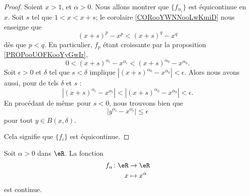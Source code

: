 \begin{proof}
	Soient \( x>1\), et \( \alpha>0\). Nous allons montrer que \( \{ f_{\alpha_i} \}\) est équicontinue en \( x\). Soit \( s\) tel que \( 1<x<x+s\); le corolaire \ref{CORooYWNNooLwKmiD} nous enseigne que
	\begin{equation}
		(x+s)^p-x^p<(x+s)^q-x^q
	\end{equation}
	dès que \( p<q\). En particulier, \( f_p\) étant croissante par la proposition \ref{PROPooUOFKooYyGwIr},
	\begin{equation}
		0<(x+s)^{\alpha_i}-x^{\alpha_i}<(x+s)^{\alpha_0}-x^{\alpha_0}.
	\end{equation}
	Soit \( \epsilon>0\) et \( \delta\) tel que \( s<\delta\) implique \( | (x+s)^{\alpha_0}-x^{\alpha_0} |<\epsilon\). Alors nous avons aussi, pour de tels \( \delta\) et \( s\) :
	\begin{equation}
		|(x+s)^{\alpha_i}-x^{\alpha_i}|<|(x+s)^{\alpha_0}-x^{\alpha_0}|<\epsilon.
	\end{equation}
	En procédant de même\ pour \( s<0\), nous trouvons bien que
	\begin{equation}
		| y^{\alpha_i}-x^{\alpha_i} |\leq \epsilon
	\end{equation}
	pour tout \( y\in B(x,\delta)\).

	Cela signifie que \( \{ f_i \}\) est équicontinue.
\end{proof}


\begin{proposition}      \label{PROPooUQNZooSSHLqr}
	Soit \( \alpha>0\) dans \( \eR\). La fonction
	\begin{equation}
		\begin{aligned}
			f_{\alpha}\colon \eR & \to \eR            \\
			x                    & \mapsto x^{\alpha}
		\end{aligned}
	\end{equation}
	est continue.
\end{proposition}

